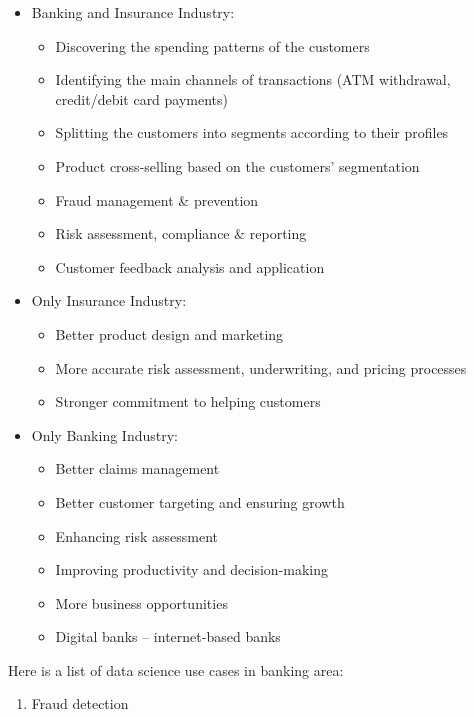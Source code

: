 \documentclass[]{book}
\providecommand{\tightlist}{%
  \setlength{\itemsep}{0pt}\setlength{\parskip}{0pt}}
\begin{document}
\begin{itemize}
\tightlist
\item
  Banking and Insurance Industry:

  \begin{itemize}
  \tightlist
  \item
    Discovering the spending patterns of the customers
  \item
    Identifying the main channels of transactions (ATM withdrawal,
    credit/debit card payments)
  \item
    Splitting the customers into segments according to their profiles
  \item
    Product cross-selling based on the customers' segmentation
  \item
    Fraud management \& prevention
  \item
    Risk assessment, compliance \& reporting
  \item
    Customer feedback analysis and application
  \end{itemize}
\item
  Only Insurance Industry:

  \begin{itemize}
  \tightlist
  \item
    Better product design and marketing
  \item
    More accurate risk assessment, underwriting, and pricing processes
  \item
    Stronger commitment to helping customers
  \end{itemize}
\item
  Only Banking Industry:

  \begin{itemize}
  \tightlist
  \item
    Better claims management
  \item
    Better customer targeting and ensuring growth
  \item
    Enhancing risk assessment
  \item
    Improving productivity and decision-making
  \item
    More business opportunities
  \item
    Digital banks -- internet-based banks
  \end{itemize}
\end{itemize}

Here is a list of data science use cases in banking area:

\begin{enumerate}
\def\labelenumi{\arabic{enumi}.}
\tightlist
\item
  Fraud detection
\end{enumerate}
\end{document}
